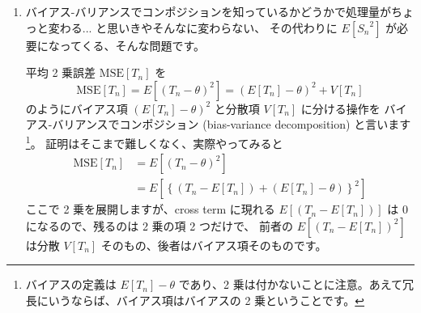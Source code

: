 \documentclass[./main.tex]{subfiles}
\begin{document}
\begin{enumerate}
        $X$ が独立にベルヌーイ分布 $Ber(\theta)$ に従いますので、まず
        \begin{equation*}
            P(X = x) = \prod_{i=1}^{n} \theta^{x_i} (1 - \theta)^{1 - x_i}
                = \theta^{\sum_{i=1}^n x_i}
                    (1 - \theta)^{ n - \sum_{i=1}^n x_i}
        \end{equation*}
        が成り立ちます。
        ここに条件 $S_n = s_n$ が追加されますと、$s_n = \sum_{i=1}^{n} x_i$ であるということですから
        \begin{equation*}
            P(X = x, S_n = s_n)
                = \theta^{s_n}  (1 - \theta)^{n - s_n}
        \end{equation*}
        であることが分かります。
        一方で、$S_n$ は二項分布 $B (n, \theta)$ に従いますので、
        \begin{equation*}
            P (S_n = s_n) = {}_{n} \mathrm{C}_{s_n} \theta^{s_n} (1 - \theta)^{n - s_n}
        \end{equation*}
        であるからして、式 \eqref{eq:2024-suri-3-cond-prob} は $1 / {}_n \mathrm{C}_{s_n}$ と、$\theta$ が現れない式になるという事です。

        \item バイアス-バリアンスでコンポジションを知っているかどうかで処理量がちょっと変わる... と思いきやそんなに変わらない、
        その代わりに $E[ {S_n}^2]$ が必要になってくる、そんな問題です。

        平均 2 乗誤差 $\mathrm{MSE} [T_n]$ を
        \begin{equation*}
            \mathrm{MSE} [T_n] 
                = E [ (T_n - \theta)^2 ] 
                    = ( E [ T_n] - \theta )^2 + V [T_n]
        \end{equation*}
        のようにバイアス項 $(E [ T_n ] - \theta)^2$ と分散項 $V [T_n]$ に分ける操作を
         バイアス-バリアンスでコンポジション (bias-variance decomposition) と言います
        \footnote{バイアスの定義は $E [ T_n ] - \theta$ であり、2 乗は付かないことに注意。あえて冗長にいうならば、バイアス項はバイアスの 2 乗ということです。}。
        証明はそこまで難しくなく、実際やってみると
        \begin{align*}
            \mathrm{MSE} [T_n] 
                &= E [ (T_n - \theta)^2 ] \\
                &= E \left[ \left\{ (T_n - E[ T_n ]) + ( E[ T_n ] - \theta) \right\}^2 \right]
        \end{align*}
        ここで 2 乗を展開しますが、cross term に現れる $E[ ( T_n - E [T_n] ) ]$ は $0$ になるので、残るのは 2 乗の項 2 つだけで、
        前者の $E [ (T_n - E[T_n])^2 ]$ は分散 $V [T_n]$ そのもの、後者はバイアス項そのものです。


\end{enumerate}
\end{document}
